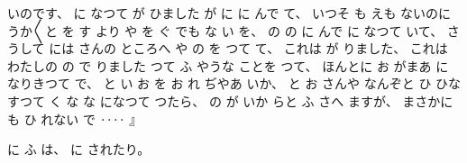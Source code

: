 いのです、
%
に
なつて
が
ひました
が
に
に
んで
て、
%
いつそ
も
えも
ないのに
うか〳〵と
を
す
より
や
を
ぐ
でも
な
い
を、
%
の
の
に
んで
に
なつて
いて、
%
さうして
には
さんの
ところへ
や%
の
を
つて
て、
%
これは
が
りました、
%
これは
わたしの
の
で
りました
つて
ふ
やうな
ことを
つて、
%
ほんとに
お
がまあ
に
なりきつて
で、
%
と
い
お
を
お
れ
ぢやあ
いか、
%
と
お
さんや
なんぞと
ひ
ひなすつて
く%
な
な
になつて
つたら、
%
の
が
いか
らと
ふ
さへ
ますが、
%
まさかに
も
ひ
れない
で
‥‥
』

%
に
ふ
は、
%
に
されたり。

